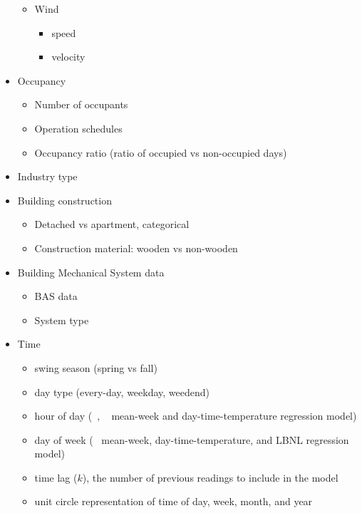 \documentclass[12pt]{article}
\begin{document}
\begin{itemize}
\begin{itemize}
  \item Wind 
    \begin{itemize}
    \item speed~\cite{mackay1996bayesian}
    \item velocity~\cite{brown2012kernel}
    \end{itemize}
  \end{itemize}
\item Occupancy
  \begin{itemize}
  \item Number of occupants~\cite{Yu20101637}
  \item Operation schedules~\cite{reddy1997baselining}
  \item Occupancy ratio (ratio of occupied vs non-occupied days)~\cite{rabl1992energy}
  \end{itemize}
\item Industry type
\item Building construction
  \begin{itemize}
  \item Detached vs apartment, categorical~\cite{Yu20101637}
  \item Construction material: wooden vs non-wooden~\cite{Yu20101637}
  \end{itemize}
\item Building Mechanical System data
  \begin{itemize}
  \item BAS data
  \item System type
  \end{itemize}
\item Time
  \begin{itemize}
  \item swing season (spring vs fall)
  \item day type (every-day, weekday, weedend)~\cite{haberl1994bin}
  \item hour of day (~\cite{haberl1994bin, wytock2013contextually},
    ~\cite{granderson2014evaluation} mean-week and
    day-time-temperature regression model)
  \item day of week (~\cite{granderson2014evaluation} mean-week, 
    day-time-temperature, and LBNL regression model)
  \item time lag ($k$), the number of previous readings to include in the model~\cite{hammarsten1987critical}
  \item unit circle representation of time of day, week, month, and year~\cite{brown2012kernel}
  \end{itemize}

\end{itemize}
\end{document}
